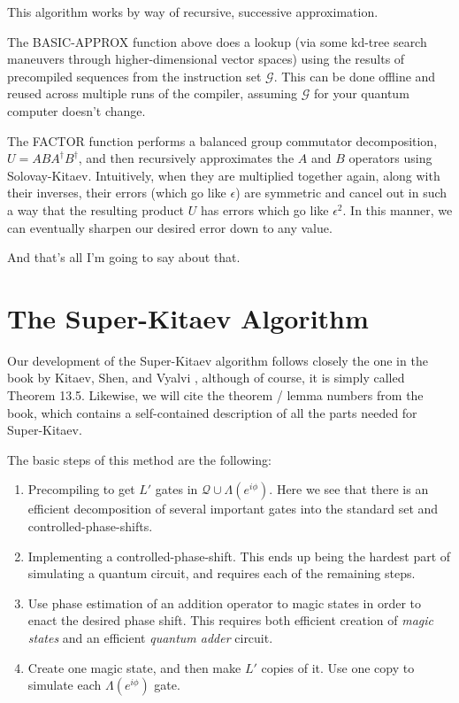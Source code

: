 \documentclass{article}
\theoremstyle{plain}
\begin{document}
This algorithm works by way of recursive, successive approximation.

The BASIC-APPROX function above does a lookup (via some kd-tree search
maneuvers through higher-dimensional vector spaces) using the results of
precompiled sequences from the instruction set $\mathcal{G}$. This can be
done offline and reused across multiple runs of the compiler, assuming
$\mathcal{G}$ for your quantum computer doesn't change.

The FACTOR function performs a balanced group commutator decomposition,
$U = ABA^\dagger B^\dagger$, and then recursively approximates the $A$ and $B$
operators using Solovay-Kitaev. Intuitively, when they are multiplied
together again, along with their inverses, their errors (which go like
$\epsilon$) are symmetric and cancel out in such a way that the resulting
product $U$ has errors which go like $\epsilon^2$. In this manner, we can
eventually sharpen our desired error down to any value.

And that's all I'm going to say about that.

\section{The Super-Kitaev Algorithm}

Our development of the Super-Kitaev algorithm follows closely the one in the
book by Kitaev, Shen, and Vyalvi \cite{ksv02}, although of course, it is
simply called Theorem 13.5. Likewise, we will cite the theorem / lemma numbers
from the book, which contains a self-contained description of all the parts
needed for Super-Kitaev.

The basic steps of this method are the following:

\begin{enumerate}
\item Precompiling to get $L'$ gates in $\mathcal{Q} \cup \Lambda(e^{i\phi})$.
Here we see that there is an
efficient decomposition of several important gates into the standard set and
controlled-phase-shifts.
\item Implementing a controlled-phase-shift. This ends up being the hardest
part of simulating a quantum circuit, and requires each of the remaining steps.
\item Use phase estimation of an addition operator to magic states in order to
enact the desired phase shift. This requires both efficient creation of
{\em magic states} and an efficient {\em quantum adder} circuit.
\item Create one magic state, and then make $L'$ copies of it. Use one copy
to simulate each $\Lambda(e^{i\phi})$ gate.
\end{enumerate}
\end{document}
